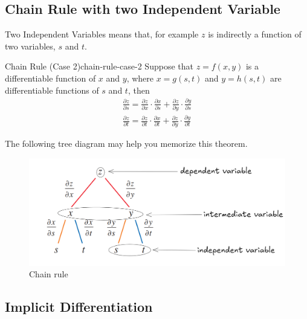 \documentclass[math,code]{amznotes}
\theoremstyle{remark}
\begin{document}
\subsection{Chain Rule with two Independent Variable}
Two Independent Variables means that, for example $z$ is indirectly a function of two variables, $s$ and $t$.
\begin{thmbox}{Chain Rule (Case 2)}{chain-rule-case-2}
    Suppose that $z=f(x,y)$ is a differentiable function of $x$ and $y$, where $x=g(s,t)$ and $y=h(s,t)$ are differentiable functions of $s$ and $t$, then
    \begin{gather*}
        \frac{\partial z}{\partial s}=\frac{\partial z}{\partial x} \cdot \frac{\partial x}{\partial s} + \frac{\partial z}{\partial y} \cdot \frac{\partial y}{\partial s} \\
        \frac{\partial z}{\partial t}=\frac{\partial z}{\partial t} \cdot \frac{\partial x}{\partial t} + \frac{\partial z}{\partial y} \cdot \frac{\partial y}{\partial t}
    \end{gather*}
\end{thmbox}
The following tree diagram may help you memorize this theorem.
\begin{figure}[H]
    \centering
    \includegraphics[width=0.5\linewidth]{images/chain-rule.png}
    \caption{Chain rule}
    \label{fig:chain-rule}
\end{figure}
\subsection{Implicit Differentiation}
\end{document}
